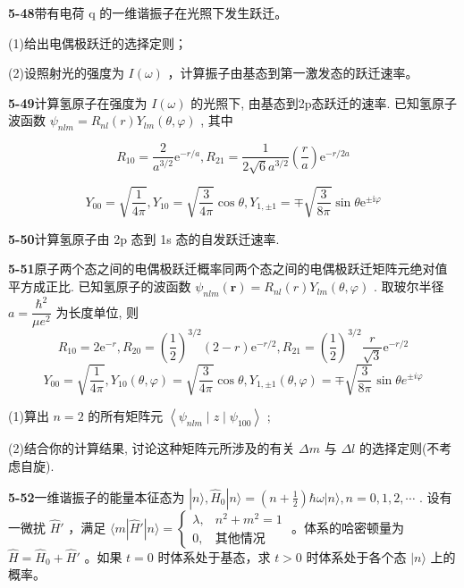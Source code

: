 \vfill

\newpage
\vfill

\noindent
\textbf{5-48}\quad 带有电荷 q 的一维谐振子在光照下发生跃迁。

(1)给出电偶极跃迁的选择定则；

(2)设照射光的强度为 $I(\omega)$ ，计算振子由基态到第一激发态的跃迁速率。

\vfill

\newpage
\vfill

\noindent
\textbf{5-49}\quad 计算氢原子在强度为 $I(\omega)$ 的光照下, 由基态到2p态跃迁的速率. 已知氢原子波函数 $\psi_{nlm} = R_{nl}(r)Y_{lm}(\theta, \varphi)$ , 其中

$$
R _ {1 0} = \frac {2}{a ^ {3 / 2}} \mathrm{e} ^ {- r / a}, R _ {2 1} = \frac {1}{2 \sqrt {6} a ^ {3 / 2}} \left(\frac {r}{a}\right) \mathrm{e} ^ {- r / 2 a}
$$

$$
Y _ {0 0} = \sqrt {\frac {1}{4 \pi}}, Y _ {1 0} = \sqrt {\frac {3}{4 \pi}} \cos \theta , Y _ {1, \pm 1} = \mp \sqrt {\frac {3}{8 \pi}} \sin \theta \mathrm{e} ^ {\pm \mathrm{i} \varphi}
$$

\vfill

\newpage
\vfill

\noindent
\textbf{5-50}\quad 计算氢原子由 2p 态到 1s 态的自发跃迁速率.

\vfill

\newpage
\vfill

\noindent
\textbf{5-51}\quad 原子两个态之间的电偶极跃迁概率同两个态之间的电偶极跃迁矩阵元绝对值平方成正比. 已知氢原子的波函数 $\psi_{nlm}(\boldsymbol{r}) = R_{nl}(r)Y_{lm}(\theta, \varphi)$ . 取玻尔半径 $a = \dfrac{\hbar^2}{\mu e^2}$ 为长度单位, 则
$$
R _ {1 0} = 2 \mathrm{e} ^ {- r}, R _ {2 0} = \left(\frac {1}{2}\right) ^ {3 / 2} (2 - r) \mathrm{e} ^ {- r / 2}, R _ {2 1} = \left(\frac {1}{2}\right) ^ {3 / 2} \frac {r}{\sqrt {3}} \mathrm{e} ^ {- r / 2}
$$
$$
Y _ {0 0} = \sqrt {\frac {1}{4 \pi}}, Y _ {1 0} (\theta , \varphi) = \sqrt {\frac {3}{4 \pi}} \cos \theta , Y _ {1, \pm 1} (\theta , \varphi) = \mp \sqrt {\frac {3}{8 \pi}} \sin \theta e ^ {\pm i \varphi}
$$

(1)算出 $n = 2$ 的所有矩阵元 $\left\langle \psi_{nlm} \mid z \mid \psi_{100} \right\rangle$ ; 

(2)结合你的计算结果, 讨论这种矩阵元所涉及的有关 $\Delta m$ 与 $\Delta l$ 的选择定则(不考虑自旋).

\vfill

\newpage
\vfill

\noindent
\textbf{5-52}\quad 一维谐振子的能量本征态为 $|n\rangle, \hat{H}_0 |n\rangle = \left(n + \frac{1}{2}\right)\hbar\omega |n\rangle, n = 0,1,2,\cdots$ . 设有一微扰 $\hat{H}'$ ，满足 $\langle m|\hat{H}'|n\rangle = \begin{cases} \lambda, & n^2 + m^2 = 1 \\ 0, & \text{其他情况} \end{cases}$ 。体系的哈密顿量为 $\hat{H} = \hat{H}_0 + \hat{H}'$ 。如果 $t = 0$ 时体系处于基态，求 $t > 0$ 时体系处于各个态 $|n\rangle$ 上的概率。

